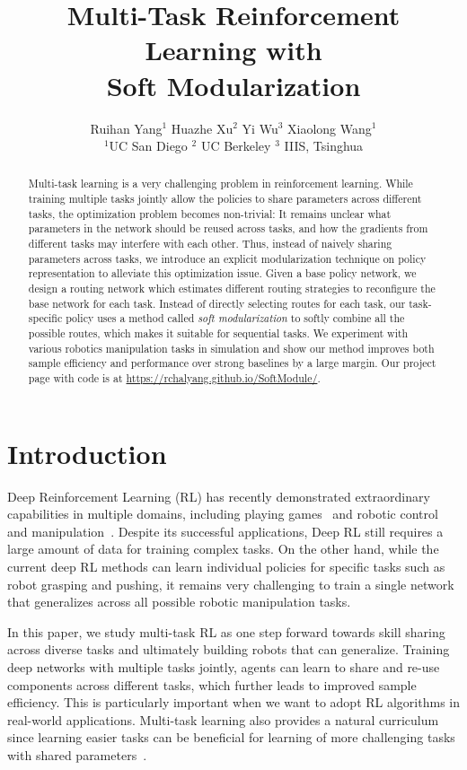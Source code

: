\documentclass{article}
\title{Multi-Task Reinforcement Learning with \\ Soft Modularization}
\author{
    Ruihan Yang$^{1}$
    \quad Huazhe Xu$^{2}$
    \quad Yi Wu$^{3}$
    \quad Xiaolong Wang$^{1}$ \\
    {${ }^{1}$UC San Diego 
    \qquad ${ }^{2}$ UC Berkeley 
    \qquad ${ }^{3}$ IIIS, Tsinghua }\\
}
\begin{document}
\maketitle


\begin{abstract}

Multi-task learning is a very challenging problem in reinforcement learning. While training multiple tasks jointly allow the policies to share parameters across different tasks, the optimization problem becomes non-trivial:  It remains unclear what parameters in the network should be reused across tasks, and how the gradients from different tasks may interfere with each other. Thus, instead of naively sharing parameters across tasks, we introduce an explicit modularization technique on policy representation to alleviate this optimization issue. Given a base policy network, we design a routing network which estimates different routing strategies to reconfigure the base network for each task. Instead of directly selecting routes for each task, our task-specific policy uses a method called \emph{soft modularization} to softly combine all the possible routes, which makes it suitable for sequential tasks. 
We experiment with various robotics manipulation tasks in simulation and show our method improves both sample efficiency and performance over strong baselines by a large margin. Our project page with code is at  \url{https://rchalyang.github.io/SoftModule/}.

\end{abstract} 
\vspace{-0.1in}
\section{Introduction}\label{sec:intro}
\vspace{-0.1in}

Deep Reinforcement Learning (RL) has recently demonstrated extraordinary capabilities in multiple domains, including playing games~\cite{mnih2013playing} and robotic control and manipulation~\cite{lillicrap2015continuous,levine2016end}. Despite its successful applications, 
Deep RL still requires a large amount of data for training complex tasks.
On the other hand, while the current deep RL methods can learn individual policies for specific tasks such as robot grasping and pushing, it remains very challenging to train a single network that generalizes across all possible robotic manipulation tasks. 

In this paper, we study multi-task RL as one step forward towards skill sharing across diverse tasks and ultimately building robots that can generalize. Training deep networks with multiple tasks jointly, agents can learn to share and re-use components across different tasks, which further leads to improved sample efficiency. This is particularly important when we want to adopt RL algorithms in real-world applications. Multi-task learning also provides a natural curriculum since learning easier tasks can be beneficial for learning of more challenging tasks with shared parameters~\cite{pinto2017learning}. 
\end{document}
